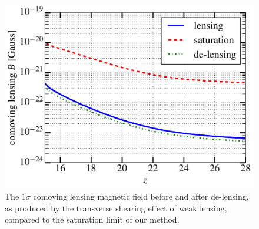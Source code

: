 \begin{figure}[h]
\centering
\includegraphics[scale=0.4]{delensingB.pdf}
\caption{The $1\sigma$ comoving lensing magnetic field before and after de-lensing, as produced by the transverse shearing effect of weak lensing, compared to the saturation limit of our method.}
\label{fig:ps_B}
\end{figure}
